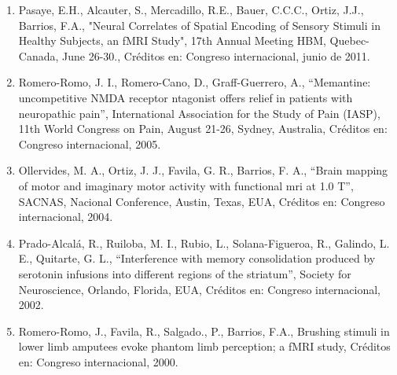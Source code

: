 \begin{enumerate}
\item Pasaye, E.H., Alcauter, S., Mercadillo, R.E., Bauer, C.C.C., Ortiz, J.J., Barrios, F.A., "Neural Correlates of Spatial 
Encoding of Sensory Stimuli in Healthy Subjects, an fMRI Study", 17th Annual Meeting HBM, Quebec-Canada, June 26-30., 
Créditos en: Congreso internacional, junio de 2011.

\item Romero-Romo, J. I., Romero-Cano, D., Graff-Guerrero, A., “Memantine: uncompetitive NMDA receptor ntagonist offers 
relief in patients with neuropathic pain”, International Association for the Study of Pain (IASP), 11th World Congress on 
Pain, August 21-26, Sydney, Australia, Créditos en: Congreso internacional, 2005.

\item Ollervides, M. A., Ortiz, J. J., Favila, G. R., Barrios, F. A., “Brain mapping of motor and imaginary motor activity 
with functional mri at 1.0 T”, SACNAS, Nacional Conference, Austin, Texas, EUA, Créditos en: Congreso internacional, 2004.

\item Prado-Alcalá, R., Ruiloba, M. I., Rubio, L., Solana-Figueroa, R., Galindo, L. E., Quitarte, G. L., “Interference with 
memory consolidation produced by serotonin infusions into different regions of the striatum”, Society for Neuroscience, Orlando, Florida, EUA, 
Créditos en: Congreso internacional, 2002.

\item Romero-Romo, J., Favila, R., Salgado., P., Barrios, F.A., Brushing stimuli in lower limb amputees evoke phantom limb 
perception; a fMRI study, Créditos en: Congreso internacional, 2000.

\end{enumerate}

